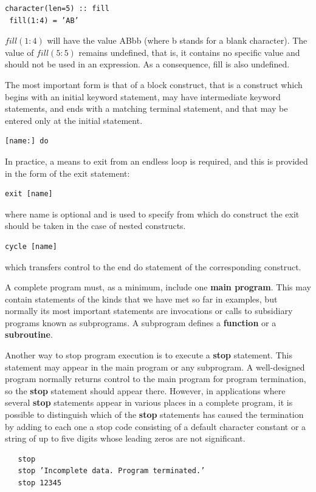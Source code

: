 \begin{verbatim}
character(len=5) :: fill
 fill(1:4) = ’AB’
\end{verbatim}
$fill(1:4)$ will have the value ABbb (where b stands for a blank character). The value of $fill(5:5)$ remains undefined, that is, it contains no specific value and should not be used in an expression. As a consequence, fill is also undefined.

The most important form is that of a block construct, that is a construct which begins with an initial keyword statement, may have intermediate keyword statements, and ends with a matching terminal statement, and that may be entered only at the initial statement. 

\begin{verbatim}
[name:] do
\end{verbatim}
In practice, a means to exit from an endless loop is required, and this is provided in the form of the exit statement:

\begin{verbatim}
exit [name]
\end{verbatim}

where name is optional and is used to specify from which do construct the exit should be taken in the case of nested constructs.

\begin{verbatim}
cycle [name]
\end{verbatim}

which transfers control to the end do statement of the corresponding construct.

A complete program must, as a minimum, include one \textbf{main program}. This may contain statements of the kinds that we have met so far in examples, but normally its most important statements are invocations or calls to subsidiary programs known as subprograms. A subprogram defines a \textbf{function} or a \textbf{subroutine}. 

Another way to stop program execution is to execute a \textbf{stop} statement. This statement may appear in the main program or any subprogram. A well-designed program normally returns control to the main program for program termination, so the \textbf{stop} statement should appear there. However, in applications where several \textbf{stop} statements appear in various places in a complete program, it is possible to distinguish which of the \textbf{stop} statements has caused the termination by adding to each one a stop code consisting of a default character constant or a string of up to five digits whose leading zeros are not significant.
\begin{verbatim}
   stop
   stop ’Incomplete data. Program terminated.’
   stop 12345
\end{verbatim}

